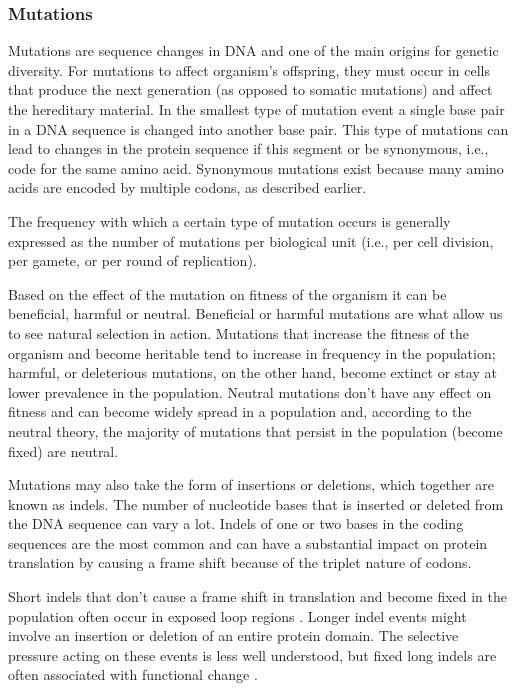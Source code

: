 \documentclass[11pt, a4paper,oneside]{report}
\begin{document}
\subsubsection{Mutations}
Mutations are sequence changes in DNA and one of the main origins for genetic diversity. For mutations to affect  organism's offspring, they must occur in cells that produce the next generation (as opposed to somatic mutations) and affect the hereditary material. In the smallest type of mutation event a single base pair in a DNA sequence is changed into another base pair. This type of mutations can lead to changes in the protein sequence if this segment or be synonymous, i.e., code for the same amino acid. Synonymous mutations exist because many amino acids are encoded by multiple codons, as described earlier.

The frequency with which a certain type of mutation occurs is generally expressed as the number of mutations per biological unit (i.e., per cell division, per gamete, or per round of replication).

Based on the effect of the mutation on fitness of the organism it can be beneficial, harmful or neutral. Beneficial or harmful mutations are what allow us to see natural selection in action. Mutations that increase the fitness of the organism and become heritable tend to increase in frequency in the population; harmful, or deleterious mutations, on the other hand, become extinct or stay at lower prevalence in the population. Neutral mutations don't have any effect on fitness and can become widely spread in a population and, according to the neutral theory, the majority of mutations that persist in the population (become fixed) are neutral. 

Mutations may also take the form of insertions or deletions, which together are known as indels. The number of nucleotide bases that is inserted or deleted from the DNA sequence can vary a lot. Indels of one or two bases in the coding sequences are the most common and can have a substantial impact on protein translation by causing a frame shift because of the triplet nature of codons.  

 Short indels that don't cause a frame shift in translation and become fixed in the population often occur in exposed loop regions \cite{Kim2010}. Longer indel events might involve an insertion or deletion of an entire protein domain. The selective pressure acting on these events is less well understood, but fixed long indels are often associated with functional change \cite{Pascual-Garcia2010}.
\end{document}
